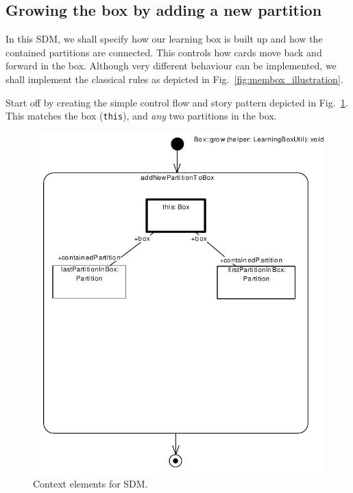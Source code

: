 \subsection{Growing the box by adding a new partition}
\label{sec:sdm_grow}	
	
In this SDM, we shall specify how our learning box is built up and how the
contained partitions are connected.  This controls how cards move back and
forward in the box.  Although very different behaviour can be implemented, we
shall implement the classical rules as depicted in
Fig.~\ref{fig:membox_illustration}.

Start off by creating the simple control flow and story pattern depicted in
Fig.~\ref{fig:sdm_grow_1}.  This matches the box (\texttt{this}), and
\emph{any} two partitions in the box.
	
\begin{figure}[htbp]
\begin{center}
  \includegraphics[width=\textwidth]{pics/sdmBilder/grow/sdm57.pdf}
  \caption{Context elements for SDM.}  
  \label{fig:sdm_grow_1}
\end{center}
\end{figure}

